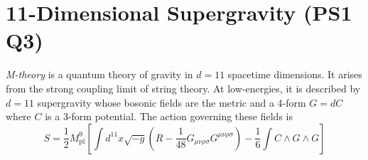 \section{11-Dimensional Supergravity (PS1 Q3)}

\textit{M-theory} is a quantum theory of gravity in $d=11$ spacetime dimensions. 
It arises from the strong coupling limit of string theory. At low-energies, it is 
described by $d=11$ supergravity whose bosonic fields are the metric and a 4-form 
$G = dC$ where $C$ is a 3-form potential. The action governing these fields is
\begin{equation}
    S = \frac{1}{2}M_{\mathrm{pl}}^9\left[\int d^{11}x\sqrt{-g}
    \left(R - \frac{1}{48}G_{\mu\nu\rho\sigma}G^{\mu\nu\rho\sigma}\right)
    - \frac{1}{6}\int C\wedge G\wedge G\right]
\end{equation}


